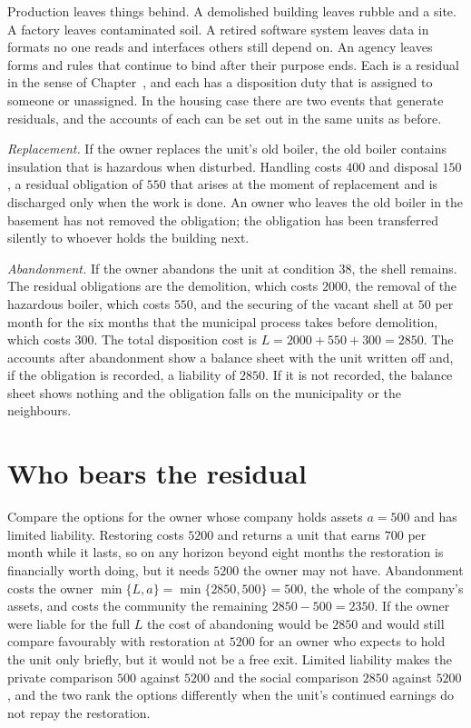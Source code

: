 Production leaves things behind. A demolished building leaves rubble and a site. A factory leaves contaminated soil. A retired software system leaves data in formats no one reads and interfaces others still depend on. An agency leaves forms and rules that continue to bind after their purpose ends. Each is a residual in the sense of Chapter~, and each has a disposition duty that is assigned to someone or unassigned. In the housing case there are two events that generate residuals, and the accounts of each can be set out in the same units as before.

\emph{Replacement.} If the owner replaces the unit's old boiler, the old boiler contains insulation that is hazardous when disturbed. Handling costs $400$ and disposal $150$, a residual obligation of $550$ that arises at the moment of replacement and is discharged only when the work is done. An owner who leaves the old boiler in the basement has not removed the obligation; the obligation has been transferred silently to whoever holds the building next.

\emph{Abandonment.} If the owner abandons the unit at condition $38$, the shell remains. The residual obligations are the demolition, which costs $2000$, the removal of the hazardous boiler, which costs $550$, and the securing of the vacant shell at $50$ per month for the six months that the municipal process takes before demolition, which costs $300$. The total disposition cost is $L=2000+550+300=2850$. The accounts after abandonment show a balance sheet with the unit written off and, if the obligation is recorded, a liability of $2850$. If it is not recorded, the balance sheet shows nothing and the obligation falls on the municipality or the neighbours.

\section{Who bears the residual}

Compare the options for the owner whose company holds assets $a=500$ and has limited liability. Restoring costs $5200$ and returns a unit that earns $700$ per month while it lasts, so on any horizon beyond eight months the restoration is financially worth doing, but it needs $5200$ the owner may not have. Abandonment costs the owner $\min\{L,a\}=\min\{2850,500\}=500$, the whole of the company's assets, and costs the community the remaining $2850-500=2350$. If the owner were liable for the full $L$ the cost of abandoning would be $2850$ and would still compare favourably with restoration at $5200$ for an owner who expects to hold the unit only briefly, but it would not be a free exit. Limited liability makes the private comparison $500$ against $5200$ and the social comparison $2850$ against $5200$, and the two rank the options differently when the unit's continued earnings do not repay the restoration.

